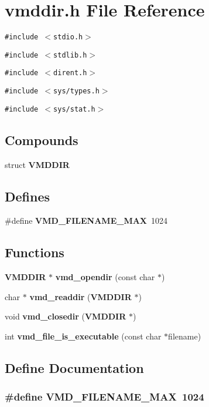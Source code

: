 \section{vmddir.h File Reference}
\label{vmddir_8h}
{\tt \#include $<$stdio.h$>$}\par
{\tt \#include $<$stdlib.h$>$}\par
{\tt \#include $<$dirent.h$>$}\par
{\tt \#include $<$sys/types.h$>$}\par
{\tt \#include $<$sys/stat.h$>$}\par
\subsection*{Compounds}
\begin{CompactItemize}
\item 
struct {\bf VMDDIR}
\end{CompactItemize}
\subsection*{Defines}
\begin{CompactItemize}
\item 
\#define {\bf VMD\_\-FILENAME\_\-MAX}\ 1024
\end{CompactItemize}
\subsection*{Functions}
\begin{CompactItemize}
\item 
{\bf VMDDIR} $\ast$ {\bf vmd\_\-opendir} (const char $\ast$)
\item 
char $\ast$ {\bf vmd\_\-readdir} ({\bf VMDDIR} $\ast$)
\item 
void {\bf vmd\_\-closedir} ({\bf VMDDIR} $\ast$)
\item 
int {\bf vmd\_\-file\_\-is\_\-executable} (const char $\ast$filename)
\end{CompactItemize}


\subsection{Define Documentation}
\subsubsection{\setlength{\rightskip}{0pt plus 5cm}\#define VMD\_\-FILENAME\_\-MAX\ 1024}\label{vmddir_8h_a0}





